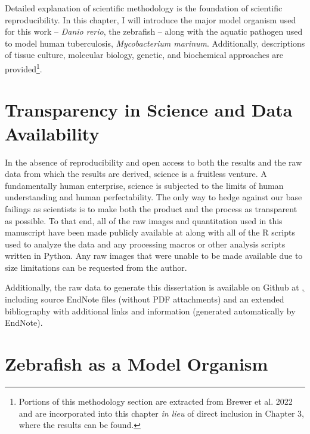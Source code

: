 Detailed explanation of scientific methodology is the foundation of scientific reproducibility. In this chapter, I will introduce the major model organism used for this work -- \textit{Danio rerio}, the zebrafish -- along with the aquatic pathogen used to model human tuberculosis, \textit{Mycobacterium marinum}. Additionally, descriptions of tissue culture, molecular biology, genetic, and biochemical approaches are provided\footnote{Portions of this methodology section are extracted from Brewer et al. 2022 and are incorporated into this chapter \textit{in lieu} of direct inclusion in Chapter 3, where the results can be found.}. 

\section{Transparency in Science and Data Availability}

In the absence of reproducibility and open access to both the results and the raw data from which the results are derived, science is a fruitless venture. A fundamentally human enterprise, science is subjected to the limits of human understanding and human perfectability. The only way to hedge against our base failings as scientists is to make both the product and the process as transparent as possible. To that end, all of the raw images and quantitation used in this manuscript have been made publicly available at \href{doi://10.5281/zenodo.6816429}{\cite{NFATZenodo}} along with all of the R scripts used to analyze the data and any processing macros or other analysis scripts written in Python. Any raw images that were unable to be made available due to size limitations can be requested from the author.

Additionally, the raw data to generate this dissertation is available on Github at \href{https://github.com/jaredbrewer/dissertation}, including source EndNote files (without PDF attachments) and an extended bibliography with additional links and information (generated automatically by EndNote).

\section{Zebrafish as a Model Organism}\label{zebrafish}

